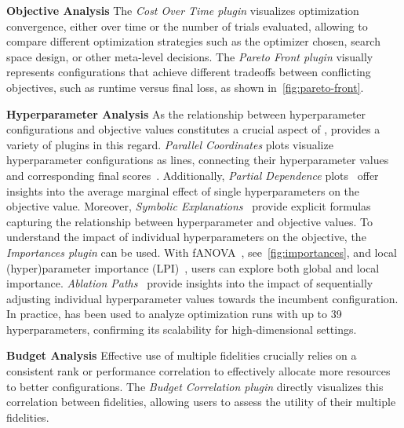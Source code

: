 \documentclass[twoside,11pt]{article}
\begin{document}
\textbf{Objective Analysis} The \textit{Cost Over Time plugin} visualizes optimization convergence, either over time or the number of trials evaluated, allowing to compare different optimization strategies such as the optimizer chosen, search space design, or other meta-level decisions. %
The \textit{Pareto Front plugin} visually represents configurations that achieve different tradeoffs between conflicting objectives, such as runtime versus final loss, as shown in~\autoref{fig:pareto-front}.

\textbf{Hyperparameter Analysis} As the relationship between hyperparameter configurations and objective values constitutes a crucial aspect of \HPO, \Deepcave provides a variety of plugins in this regard.
\textit{Parallel Coordinates} plots visualize hyperparameter configurations as lines, connecting their hyperparameter values and corresponding final scores~\citep{golovin-kdd17a}. 
Additionally, \textit{Partial Dependence} plots~\citep{friedman-as01a, moosbauer-neurips21a} offer insights into the average marginal effect of single hyperparameters on the objective value. 
Moreover, \textit{Symbolic Explanations}~\citep{segel-automl23a} provide explicit formulas capturing the relationship between hyperparameter and objective values.
To understand the impact of individual hyperparameters on the objective, the \textit{Importances plugin} can be used.
With fANOVA~\citep{hutter-icml14a}, see~\autoref{fig:importances}, and local (hyper)parameter importance (LPI)~\citep{biedenkapp-lion18a}, users can explore both global and local importance.
\textit{Ablation Paths}~\citep{biedenkapp-aaai17a} provide insights into the impact of sequentially adjusting individual hyperparameter values towards the incumbent configuration. In practice, \Deepcave has been used to analyze optimization runs with up to 39 hyperparameters, confirming its scalability for high-dimensional settings.

\textbf{Budget Analysis} Effective use of multiple fidelities crucially relies on a consistent rank or performance correlation to effectively allocate more resources to better configurations.
The \textit{Budget Correlation plugin} directly visualizes this correlation between fidelities, allowing users to assess the utility of their multiple fidelities.
\end{document}
